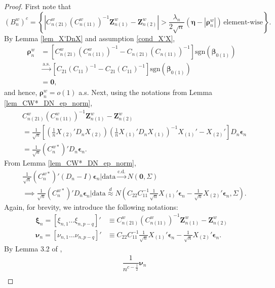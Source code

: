 \documentclass[12pt]{article}
\newcommand{\be}{\bm{\beta}} %
\newcommand{\ep}{\bm{\epsilon}} %
\newcommand{\dn}{\frac{1}{n}} %
\newcommand{\dqn}{\frac{1}{\sqrt{n}}} %
\newcommand{\CONV}[1]{\stackrel{\text{#1}}{\longrightarrow}} %
\newcommand{\cnwa}{C_{n(11)}^w}
\newcommand{\cnwc}{C_{n(21)}^w}
\newcommand{\znwa}{\bm{Z}_{n(1)}^w}
\newcommand{\znwb}{\bm{Z}_{n(2)}^w}
\begin{document}
\begin{proof}
	First note that
	$$
	\left( B_n^w \right)^c =
	\left\{
			\left|
				\cnwc \left( \cnwa \right)^{-1} \znwa - \znwb 
			\right| 
			> \dfrac{\lambda_n}{2 \sqrt{n}}
			 \left(
				\bm{\eta} 
				- \left| \bm{\rho}_n^w \right| 
			 \right)
			\, \text{element-wise}
	\right\}.
	$$
	By Lemma \ref{lem_X'DnX} and assumption \ref{cond_X'X},
	\begin{align*}
	\bm{\rho}_n^w  
	&= \left[
			\cnwc \left(\cnwa\right)^{-1}
			- C_{n(21)} \left( C_{n(11)} \right)^{-1} 
	  \right]
	  \text{sgn} 
	  \left( \be_{0(1)} \right) \\
	 &\CONV{a.s.} 
	 \left[
	 		C_{21} \left( C_{11} \right)^{-1}
	 	  - C_{21} \left( C_{11} \right)^{-1} 
	 \right]
	 \text{sgn} 
	 \left( \be_{0(1)} \right)\\
	 &= \bm{0},
	\end{align*}
	and hence, $\bm{\rho}_n^w = o(1)$ a.s. Next, using the notations from Lemma \ref{lem_CW*_DN_ep_norm},
	\begin{align*}
		&\cnwc \left( \cnwa \right)^{-1} \znwa - \znwb \\
		&= \dqn \left[
					\left(
						\dn X_{(2)}' D_n X_{(2)}
					\right)
					\left(
						\dn X_{(1)}' D_n X_{(1)}
					\right)^{-1}
					X_{(1)}' - X_{(2)}'
				\right]
			D_n \ep_n \\
		&= \dqn \left( C_n^{w*} \right)' D_n \ep_n. 
	\end{align*}
	From Lemma \ref{lem_CW*_DN_ep_norm},
	\begin{align*}
	&\dqn \left( C_n^{w*} \right)' (D_n - I) \ep_n 
	\bigg| \text{data}
	\CONV{c.d.} 
	N \left( \bm{0}, \Sigma \right) \\
	&\implies \dqn \left( C_n^{w*} \right)' D_n \ep_n
	\bigg| \text{data}
	\stackrel{d}{\approx}
	N \left( 
			C_{22} C_{11}^{-1} \dqn X_{(1)}' \ep_n 
			- \dqn X_{(2)}' \ep_n , 
			\Sigma 
	  \right). 
	\end{align*}
	Again, for brevity, we introduce the following notations:
	\begin{align*}
		\bm{\xi}_n = \left[ \xi_{n,1} \ldots \xi_{n,p-q} \right]'
		&\equiv \cnwc \left( \cnwa \right)^{-1} \znwa - \znwb \\
		\bm{\nu}_n = \left[ \nu_{n,1} \ldots \nu_{n,p-q} \right]'
		&\equiv C_{22} C_{11}^{-1} \dqn X_{(1)}' \ep_n - \dqn X_{(2)}' \ep_n. 
	\end{align*}
	By Lemma 3.2 of \citet{Chatterjee&Lahiri}, 
	\begin{align*}
		&\dfrac{1}{ n ^ {c - \frac{1}{2} } } \bm{\nu}_n \\

\end{align*}
\end{proof}
\end{document}
